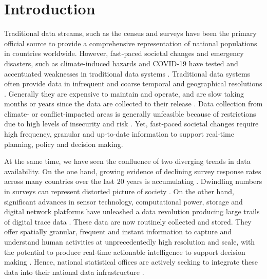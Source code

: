 \documentclass[]{rsos}%
\begin{document}
\providecommand{\EndFirstPage}{%
}

\maketitle

\newpage

\section{Introduction}\label{introduction}

Traditional data streams, such as the census and surveys have been the
primary official source to provide a comprehensive representation of
national populations in countries worldwide. However, fast-paced
societal changes and emergency disasters, such as climate-induced
hazards and COVID-19 have tested and accentuated weaknesses in
traditional data systems \citep{green2021}. Traditional data systems often
provide data in infrequent and coarse temporal and geographical
resolutions \citep{rowe23-bigdata}. Generally they are expensive to maintain
and operate, and are slow taking months or years since the data are
collected to their release \citep{rowe23-bigdata}. Data collection from
climate- or conflict-impacted areas is generally unfeasible because of
restrictions due to high levels of insecurity and risk
\citep{iradukunda2025}. Yet, fast-paced societal changes require high
frequency, granular and up-to-date information to support real-time
planning, policy and decision making.

At the same time, we have seen the confluence of two diverging trends in
data availability. On the one hand, growing evidence of declining survey
response rates across many countries over the last 20 years is
accumulating \citep{de2002trends, stedman2019, luiten2020}. Dwindling
numbers in surveys can represent distorted picture of society
\citep{luiten2020}. On the other hand, significant advances in sensor
technology, computational power, storage and digital network platforms
have unleashed a data revolution producing large trails of digital trace
data \citep{kitchin2014data}. These data are now routinely collected and
stored. They offer spatially granular, frequent and instant information
to capture and understand human activities at unprecedentedly high
resolution and scale, with the potential to produce real-time actionable
intelligence to support decision making \citep{rowe23-bigdata}. Hence,
national statistical offices are actively seeking to integrate these
data into their national data infrastructure \citep{unstatsMobilePhone2025, sdruk2025}.
\end{document}
